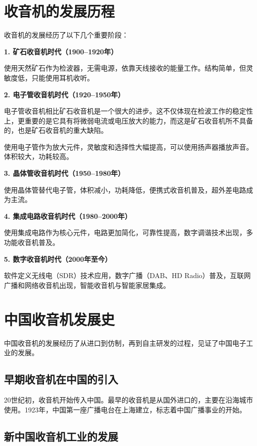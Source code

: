 \documentclass[12pt,UTF8]{ctexbook}
\begin{document}
\section{收音机的发展历程}

收音机的发展经历了以下几个重要阶段：

\textbf{1. 矿石收音机时代（1900--1920年）}

使用天然矿石作为检波器，无需电源，依靠天线接收的能量工作。结构简单，但灵敏度低，只能使用耳机收听。

\textbf{2. 电子管收音机时代（1920--1950年）}

电子管收音机相比矿石收音机是一个很大的进步。这不仅体现在检波工作的稳定性上，更重要的是它具有将微弱电流或电压放大的能力，而这是矿石收音机所不具备的，也是矿石收音机的重大缺陷。

使用电子管作为放大元件，灵敏度和选择性大幅提高，可以使用扬声器播放声音。体积较大，功耗较高。

\textbf{3. 晶体管收音机时代（1950--1980年）}

使用晶体管替代电子管，体积减小，功耗降低，便携式收音机普及，超外差电路成为主流。

\textbf{4. 集成电路收音机时代（1980--2000年）}

使用集成电路作为核心元件，电路更加简化，可靠性提高，数字调谐技术出现，多功能收音机普及。

\textbf{5. 数字收音机时代（2000年至今）}

软件定义无线电（SDR）技术应用，数字广播（DAB、HD Radio）普及，互联网广播和网络收音机出现，智能收音机与智能家居集成。

\section{中国收音机发展史}

中国收音机的发展经历了从进口到仿制，再到自主研发的过程，见证了中国电子工业的发展。

\subsection{早期收音机在中国的引入}

20世纪初，收音机开始传入中国。最早的收音机是从国外进口的，主要在沿海城市使用。1923年，中国第一座广播电台在上海建立，标志着中国广播事业的开始。

\subsection{新中国收音机工业的发展}
\end{document}
